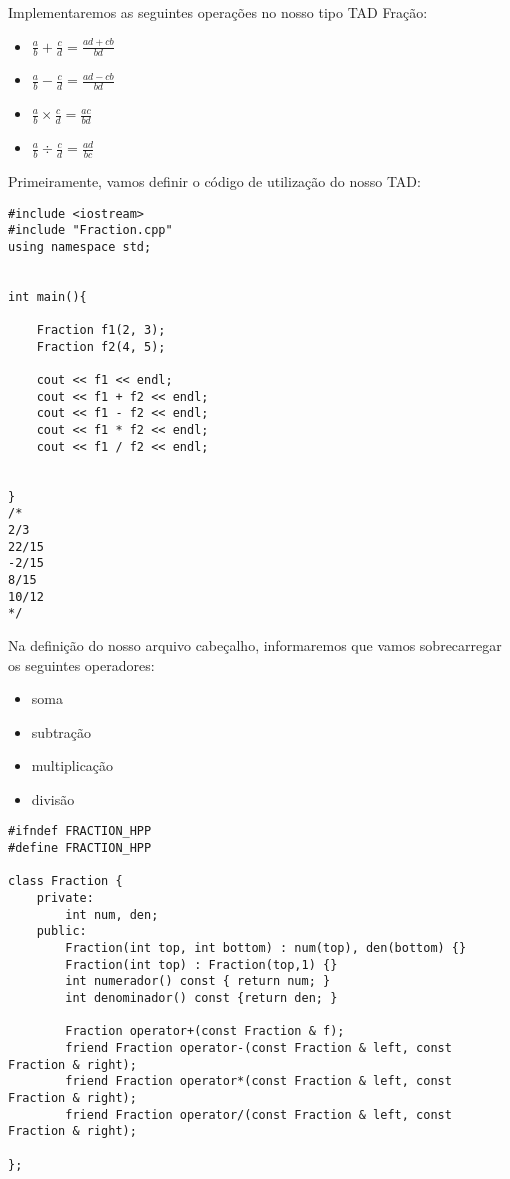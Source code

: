 Implementaremos as seguintes operações no nosso tipo TAD Fração:

\begin{itemize}
    \item $\frac{a}{b} + \frac{c}{d} = \frac{ad + cb}{bd}$
    \item $\frac{a}{b} - \frac{c}{d} = \frac{ad - cb}{bd}$
    \item $\frac{a}{b} \times \frac{c}{d} = \frac{ac}{bd}$
    \item $\frac{a}{b} \div \frac{c}{d} = \frac{ad}{bc}$
    
    
\end{itemize}

Primeiramente, vamos definir o código de utilização do nosso TAD:

\begin{verbatim}
#include <iostream>
#include "Fraction.cpp"
using namespace std;


int main(){

	Fraction f1(2, 3);
	Fraction f2(4, 5);
	
	cout << f1 << endl;
	cout << f1 + f2 << endl;
	cout << f1 - f2 << endl;
	cout << f1 * f2 << endl;
	cout << f1 / f2 << endl;
	
	
}
/*
2/3
22/15
-2/15
8/15
10/12
*/
\end{verbatim}


Na definição do nosso arquivo cabeçalho, informaremos que vamos sobrecarregar os seguintes operadores:

\begin{itemize}
    \item soma
    \item subtração
    \item multiplicação
    \item divisão
\end{itemize}


\begin{verbatim}
#ifndef FRACTION_HPP
#define FRACTION_HPP

class Fraction {
	private:
		int num, den;
	public:
		Fraction(int top, int bottom) : num(top), den(bottom) {}
		Fraction(int top) : Fraction(top,1) {}
		int numerador() const { return num; }
		int denominador() const {return den; }

        Fraction operator+(const Fraction & f);
		friend Fraction operator-(const Fraction & left, const Fraction & right);
		friend Fraction operator*(const Fraction & left, const Fraction & right);
		friend Fraction operator/(const Fraction & left, const Fraction & right);
		
};

\end{verbatim}

